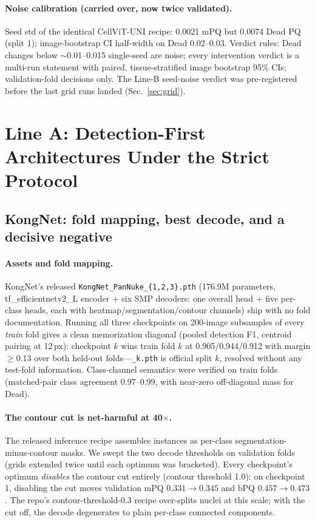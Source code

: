 \documentclass[11pt]{article}
\begin{document}
\paragraph{Noise calibration (carried over, now twice validated).} Seed std of the identical
CellViT-UNI recipe: 0.0021 mPQ but 0.0074 Dead PQ (split 1); image-bootstrap CI half-width on
Dead 0.02--0.03. Verdict rules: Dead changes below $\sim$0.01--0.015 single-seed are noise;
every intervention verdict is a multi-run statement with paired, tissue-stratified image
bootstrap 95\% CIs; validation-fold decisions only. The Line-B seed-noise verdict was
pre-registered before the last grid runs landed (Sec.~\ref{sec:grid}).

\section{Line A: Detection-First Architectures Under the Strict Protocol}
\label{sec:lineA}

\subsection{KongNet: fold mapping, best decode, and a decisive negative}
\label{sec:kongnet}

\paragraph{Assets and fold mapping.} KongNet's released \texttt{KongNet\_PanNuke\_\{1,2,3\}.pth}
(176.9M parameters, tf\_efficientnetv2\_L encoder + six SMP decoders: one overall head + five
per-class heads, each with heatmap/segmentation/contour channels) ship with no fold
documentation. Running all three checkpoints on 200-image subsamples of every \emph{train}
fold gives a clean memorization diagonal (pooled detection F1, centroid pairing at 12\,px):
checkpoint $k$ wins train fold $k$ at 0.905/0.944/0.912 with margin $\geq$0.13 over both
held-out folds---\texttt{\_k.pth} is official split $k$, resolved without any test-fold
information. Class-channel semantics were verified on train folds (matched-pair class
agreement 0.97--0.99, with near-zero off-diagonal mass for Dead).

\paragraph{The contour cut is net-harmful at 40$\times$.} The released inference recipe
assembles instances as per-class segmentation-minus-contour masks. We swept the two decode
thresholds on validation folds (grids extended twice until each optimum was bracketed).
Every checkpoint's optimum \emph{disables} the contour cut entirely (contour threshold 1.0):
on checkpoint 1, disabling the cut moves validation mPQ $0.331\!\to\!0.345$ and bPQ
$0.457\!\to\!0.473$. The repo's contour-threshold-0.3 recipe over-splits nuclei at this
scale; with the cut off, the decode degenerates to plain per-class connected components.
\end{document}
